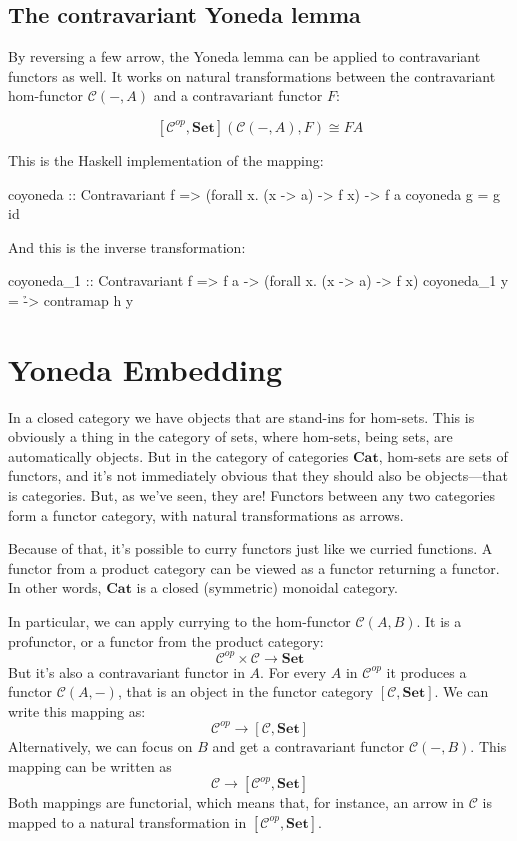 \documentclass[DaoFP]{subfiles}
\begin{document}
\subsection{The contravariant Yoneda lemma}

By reversing a few arrow, the Yoneda lemma can be applied to contravariant functors as well. It works on natural transformations between the contravariant hom-functor $\mathcal{C}(-, A)$ and a contravariant functor $F$:

\[ [\mathcal{C}^{op}, \mathbf{Set}]( \mathcal{C}(-, A), F) \cong F A \]

This is the Haskell implementation of the mapping:
\begin{haskell}
coyoneda :: Contravariant f => (forall x. (x -> a) -> f x) -> f a
coyoneda g = g id
\end{haskell}
And this is the inverse transformation:
\begin{haskell}
coyoneda_1 :: Contravariant f => f a -> (forall x. (x -> a) -> f x)
coyoneda_1 y = \h -> contramap h y
\end{haskell}

\section{Yoneda Embedding}

In a closed category we have objects that are stand-ins for hom-sets. This is obviously a thing in the category of sets, where hom-sets, being sets, are automatically objects. But in the category of categories  $\mathbf{Cat}$, hom-sets are sets of functors, and it's not immediately obvious that they should also be objects---that is categories. But, as we've seen, they are! Functors between any two categories form a functor category, with natural transformations as arrows.

Because of that, it's possible to curry functors just like we curried functions. A functor from a product category can be viewed as a functor returning a functor. In other words, $\mathbf{Cat}$ is a closed (symmetric) monoidal category.

In particular, we can apply currying to the hom-functor $\mathcal{C}(A, B)$. It is a profunctor, or a functor from the product category:
\[ \mathcal{C}^{op} \times \mathcal{C} \to  \mathbf{Set} \]
But it's also a contravariant functor in $A$. For every $A$ in  $\mathcal{C}^{op}$  it produces a functor $\mathcal{C}(A, -)$, that is an object in the functor category $ [\mathcal{C},  \mathbf{Set}] $. We can write this mapping as:
\[ \mathcal{C}^{op} \to [\mathcal{C},  \mathbf{Set}] \]
Alternatively, we can focus on $B$ and get a contravariant functor $\mathcal{C}(-, B)$. This mapping can be written as
\[ \mathcal{C} \to [\mathcal{C}^{op},  \mathbf{Set}] \]
Both mappings are functorial, which means that, for instance, an arrow in $\mathcal{C}$ is mapped to a natural transformation in $[\mathcal{C}^{op},  \mathbf{Set}]$.
\end{document}
